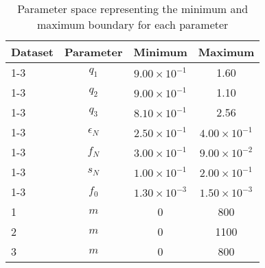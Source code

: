 \begin{table}[!htbp]
\centering
\caption{Parameter space representing the minimum and maximum boundary for each parameter}
\label{tab:parameter_space_all}
\begin{tabular}{lccc}
\toprule
\textbf{Dataset} &  \textbf{Parameter} & \textbf{Minimum} & \textbf{Maximum}\\
\midrule
{1-3} &    \textbf{$q_1$} &  $9.00\times10^{-1}$ &    1.60 \\
{1-3} &    \textbf{$q_2$} &  $9.00\times10^{-1}$ &    1.10 \\
{1-3} &    \textbf{$q_3$} &  $8.10\times10^{-1}$ &    2.56 \\
{1-3} &    \textbf{$\epsilon_N$} &  $2.50\times10^{-1}$ &    $4.00\times10^{-1}$\\
{1-3} &    \textbf{$f_N$} &  $3.00\times10^{-1}$ &    $9.00\times10^{-2}$ \\
{1-3} &    \textbf{$s_N$} &  $1.00\times10^{-1}$ &    $2.00\times10^{-1}$ \\
{1-3} &    \textbf{$f_0$} &  $1.30\times10^{-3}$ &    $1.50\times10^{-3}$ \\
{1} &    \textbf{$m$} &  0 &  800 \\
{2} &    \textbf{$m$} &  0 &  1100 \\
{3} &    \textbf{$m$} &  0 &  800 \\
\bottomrule
\end{tabular}
\end{table}
